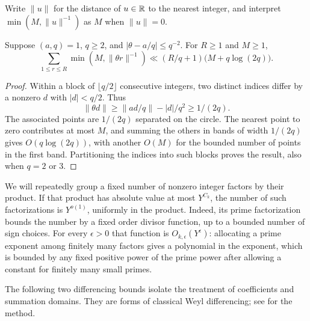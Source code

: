 Write $\|u\|$ for the distance of $u\in\mathbb R$ to the
nearest integer, and interpret $\min(M,\|u\|^{-1})$ as $M$ when
$\|u\|=0$.

\begin{lemma}\label{lem:rational-spacing}
Suppose $(a,q)=1$, $q\ge2$, and $|\theta-a/q|\le q^{-2}$.
For $R\ge1$ and $M\ge1$,
\begin{equation}\label{eq:rational-spacing}
 \sum_{1\le r\le R}\min(M,\|\theta r\|^{-1})
 \ll (R/q+1)\bigl(M+q\log(2q)\bigr).
\end{equation}
\end{lemma}

\begin{proof}
Within a block of $\lfloor q/2\rfloor$ consecutive integers, two distinct
indices differ by a nonzero $d$ with $|d|<q/2$.  Thus
\[
 \|\theta d\|\ge \|ad/q\|-|d|/q^2\ge1/(2q).
\]
The associated points are $1/(2q)$ separated on the circle.  The nearest
point to zero contributes at most $M$, and summing the others in bands
of width $1/(2q)$ gives $O(q\log(2q))$, with another $O(M)$ for the
bounded number of points in the first band.  Partitioning the indices
into such blocks proves the result, also when $q=2$ or $3$.
\end{proof}

We will repeatedly group a fixed number of nonzero integer factors by
their product.  If that product has absolute value at most $Y^{C_k}$,
the number of such factorizations is $Y^{o(1)}$, uniformly in the
product.  Indeed, its prime factorization bounds the number by a fixed
order divisor function, up to a bounded number of sign choices.  For
every $\epsilon>0$ that function is $O_{k,\epsilon}(Y^\epsilon)$:
allocating a prime exponent among finitely many factors gives a
polynomial in the exponent, which is bounded by any fixed positive
power of the prime power after allowing a constant for finitely many
small primes.

The following two differencing bounds isolate the treatment of
coefficients and summation domains.  They are forms of classical Weyl
differencing; see \cite{Weyl1916,Vaughan1997} for the method.

